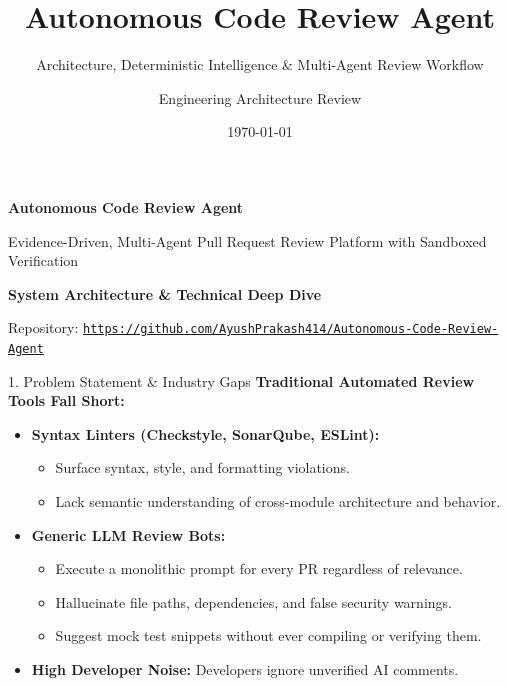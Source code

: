 \documentclass[aspectratio=169,11pt]{beamer}
\title{\textbf{Autonomous Code Review Agent}}
\subtitle{Architecture, Deterministic Intelligence \& Multi-Agent Review Workflow}
\author{Engineering Architecture Review}
\institute{Autonomous Review Platform}
\date{\today}
\begin{document}
\begin{frame}[plain]
  \vspace{1.0cm}
  {\Large\textbf{\color{accentNavy}Autonomous Code Review Agent}}
  
  \vspace{0.25cm}
  {\normalsize\color{textMuted}Evidence-Driven, Multi-Agent Pull Request Review Platform with Sandboxed Verification}
  
  \vspace{0.5cm}
  \noindent{\color{lineColor}\rule{0.35\textwidth}{1pt}}
  
  \vspace{0.35cm}
  {\footnotesize\textbf{System Architecture \& Technical Deep Dive}}
  
  \vspace{0.35cm}
  {\footnotesize\color{textMuted}Repository: \href{https://github.com/AyushPrakash414/Autonomous-Code-Review-Agent}{\color{accentNavy}\texttt{https://github.com/AyushPrakash414/Autonomous-Code-Review-Agent}}}
\end{frame}

\begin{frame}{1. Problem Statement \& Industry Gaps}
  \textbf{Traditional Automated Review Tools Fall Short:}
  \vspace{0.25cm}
  \begin{itemize}
    \item \textbf{Syntax Linters (Checkstyle, SonarQube, ESLint):}
      \begin{itemize}
        \item Surface syntax, style, and formatting violations.
        \item Lack semantic understanding of cross-module architecture and behavior.
      \end{itemize}
    \vspace{0.25cm}
    \item \textbf{Generic LLM Review Bots:}
      \begin{itemize}
        \item Execute a monolithic prompt for every PR regardless of relevance.
        \item Hallucinate file paths, dependencies, and false security warnings.
        \item Suggest mock test snippets without ever compiling or verifying them.
      \end{itemize}
    \vspace{0.25cm}
    \item \textbf{High Developer Noise:} Developers ignore unverified AI comments.
  \end{itemize}
\end{frame}
\end{document}
